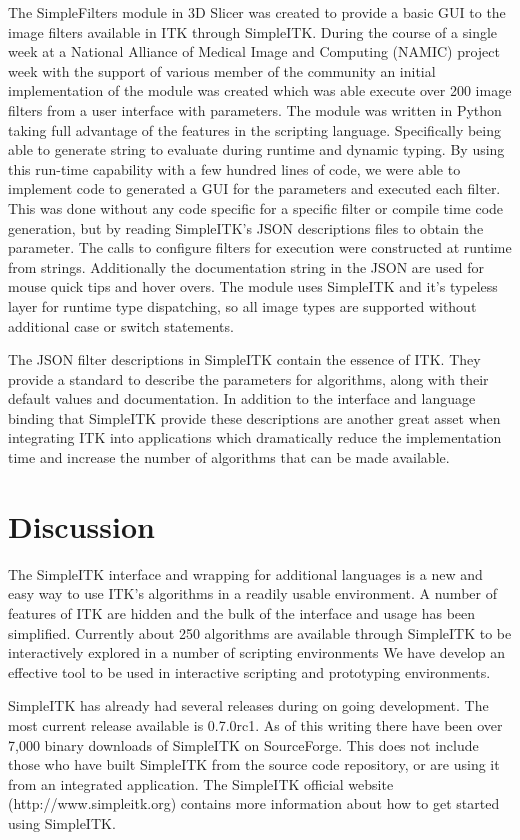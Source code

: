 \documentclass{frontiersMED} %
\begin{document}
The SimpleFilters module in 3D Slicer was created to provide a basic
GUI to the image filters available in ITK through SimpleITK. During
the course of a single week at a National Alliance of Medical Image
and Computing (NAMIC) project week with the support of various member
of the community an initial implementation of the module was created
which was able execute over 200 image filters  from a user interface
with parameters. The module was written in Python taking full
advantage of the features in the scripting language. Specifically
being able to generate string to evaluate during runtime and dynamic
typing. By using this run-time capability with a few hundred lines of
code, we were able to implement code to generated a GUI for the
parameters and executed each filter. This was done without any code
specific for a specific filter or compile time code generation, but by
reading SimpleITK’s JSON descriptions files to obtain the
parameter. The calls to configure filters for execution were
constructed at runtime from strings. Additionally the documentation
string in the JSON are used for mouse quick tips and hover overs. The
module uses SimpleITK and it’s typeless layer for runtime type
dispatching, so all image types are supported without additional case
or switch statements.

The JSON filter descriptions in SimpleITK contain the essence of
ITK. They provide a standard to describe the parameters for
algorithms, along with their default values and documentation. In
addition to the interface and language binding that SimpleITK provide
these descriptions are another great asset when integrating ITK into
applications which dramatically reduce the implementation time and
increase the number of algorithms that can be made available.

\section{Discussion}
The SimpleITK interface and wrapping for additional languages is a new
and easy way to use ITK’s algorithms in a readily usable
environment. A number of features of ITK are hidden and the bulk of
the interface and usage has been simplified. Currently about 250
algorithms are available through SimpleITK to be interactively
explored in a number of scripting environments We have develop an
effective tool to be used in interactive scripting and prototyping
environments.

SimpleITK has already had several releases during on going
development. The most current release available is 0.7.0rc1. As of
this writing there have been over 7,000 binary downloads of SimpleITK
on SourceForge. This does not include those who have built SimpleITK
from the source code repository, or are using it from an integrated
application. The SimpleITK official website (http://www.simpleitk.org)
contains more information about how to get started using SimpleITK.
\end{document}
